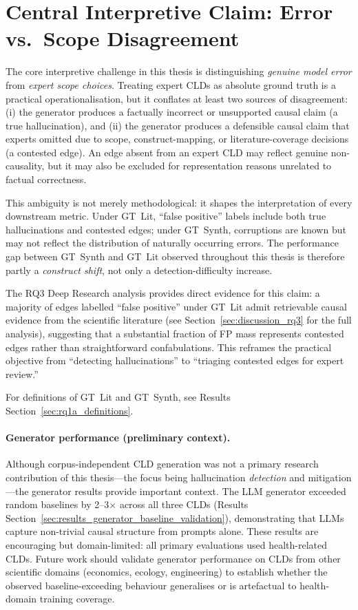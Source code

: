 \section{Central Interpretive Claim: Error vs.\ Scope Disagreement}
\label{sec:discussion_framing}
The core interpretive challenge in this thesis is distinguishing \emph{genuine model error} from \emph{expert scope choices}. Treating expert CLDs as absolute ground truth is a practical operationalisation, but it conflates at least two sources of disagreement: (i) the generator produces a factually incorrect or unsupported causal claim (a true hallucination), and (ii) the generator produces a defensible causal claim that experts omitted due to scope, construct-mapping, or literature-coverage decisions (a contested edge). An edge absent from an expert CLD may reflect genuine non-causality, but it may also be excluded for representation reasons unrelated to factual correctness.

This ambiguity is not merely methodological: it shapes the interpretation of every downstream metric. Under GT~Lit, ``false positive'' labels include both true hallucinations and contested edges; under GT~Synth, corruptions are known but may not reflect the distribution of naturally occurring errors. The performance gap between GT~Synth and GT~Lit observed throughout this thesis is therefore partly a \emph{construct shift}, not only a detection-difficulty increase.

The RQ3 Deep Research analysis provides direct evidence for this claim: a majority of edges labelled ``false positive'' under GT~Lit admit retrievable causal evidence from the scientific literature (see Section~\ref{sec:discussion_rq3} for the full analysis), suggesting that a substantial fraction of FP mass represents contested edges rather than straightforward confabulations. This reframes the practical objective from ``detecting hallucinations'' to ``triaging contested edges for expert review.''

For definitions of GT~Lit and GT~Synth, see Results Section~\ref{sec:rq1a_definitions}.

\paragraph{Generator performance (preliminary context).}
Although corpus-independent CLD generation was not a primary research contribution of this thesis---the focus being hallucination \emph{detection} and mitigation---the generator results provide important context. The LLM generator exceeded random baselines by 2--3$\times$ across all three CLDs (Results Section~\ref{sec:results_generator_baseline_validation}), demonstrating that LLMs capture non-trivial causal structure from prompts alone. These results are encouraging but domain-limited: all primary evaluations used health-related CLDs. Future work should validate generator performance on CLDs from other scientific domains (economics, ecology, engineering) to establish whether the observed baseline-exceeding behaviour generalises or is artefactual to health-domain training coverage.

